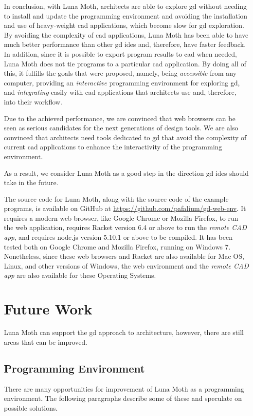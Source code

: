In conclusion, with Luna Moth, architects are able to explore \gls{gd} without needing to install and update the programming environment and avoiding the installation and use of heavy-weight \gls{cad} applications, which become slow for \gls{gd} exploration.
By avoiding the complexity of \gls{cad} applications, Luna Moth has been able to have much better performance than other \gls{gd} \glspl{ide} and, therefore, have faster feedback.
In addition, since it is possible to export program results to \gls{cad} when needed, Luna Moth does not tie programs to a particular \gls{cad} application.
By doing all of this, it fulfills the goals that were proposed, namely, being \textit{accessible} from any computer, providing an \textit{interactive} programming environment for exploring \gls{gd}, and \textit{integrating} easily with \gls{cad} applications that architects use and, therefore, into their workflow.

Due to the achieved performance, we are convinced that web browsers can be seen as serious candidates for the next generations of design tools.
We are also convinced that architects need tools dedicated to \gls{gd} that avoid the complexity of current \gls{cad} applications to enhance the interactivity of the programming environment.

As a result, we consider Luna Moth as a good step in the direction \gls{gd} \glspl{ide} should take in the future.

The source code for Luna Moth, along with the source code of the example programs, is available on GitHub at \url{https://github.com/pafalium/gd-web-env}.
It requires a modern web browser, like Google Chrome or Mozilla Firefox, to run the web application, requires Racket version 6.4 or above to run the \textit{remote CAD app}, and requires node.js version 5.10.1 or above to be compiled.
It has been tested both on Google Chrome and Mozilla Firefox, running on Windows 7.
Nonetheless, since these web browsers and Racket are also available for Mac OS, Linux, and other versions of Windows, the web environment and the \textit{remote CAD app} are also available for these Operating Systems.


\section{Future Work}
Luna Moth can support the \gls{gd} approach to architecture, however, there are still areas that can be improved.


\subsection{Programming Environment}
There are many opportunities for improvement of Luna Moth as a programming environment.
The following paragraphs describe some of these and speculate on possible solutions.


